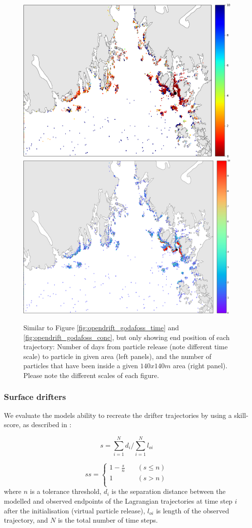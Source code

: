 \begin{figure}[ht]
\centerline{
\includegraphics*[width=.5\textwidth]{Figurer/opendrift/opendrift_godafoss_shortest_time_zoom_endpos_crop}
\includegraphics*[width=.5\textwidth]{Figurer/opendrift/opendrift_godafoss_consentration_zoom_endpos_crop}
}
\caption{\small
Similar to Figure \ref{fig:opendrift_godafoss_time} and \ref{fig:opendrift_godafoss_conc}, but only showing end position of each trajectory: Number of days from particle release (note different time scale) to particle in given area (left panels), and the number of particles that have been inside a given $140x140m$ area (right panel). Please note the different scales of each figure.}
\label{fig:opendrift_godafoss_endpos}
\end{figure}

\clearpage 
\subsubsection{Surface drifters}
We evaluate the models ability to recreate the drifter trajectories by using a skill-score, as described in \cite{liu:2011}: 

$$s=\displaystyle\sum_{i=1}^{N} d_i / \displaystyle\sum_{i=1}^{N} l_{oi}$$

\[ ss = 
  \begin{cases}
    1 - \frac{s}{n}   & \quad (s \leq n)\\
    1                & \quad (s > n)   \\ 
  \end{cases}
\]
where $n$ is a tolerance threshold, $d_i$ is the separation distance between the modelled and observed endpoints of the Lagrangian trajectories at time step $i$ after the initialisation (virtual particle release), $l_{oi}$ is length of the observed trajectory, and $N$ is the total number of time steps.

